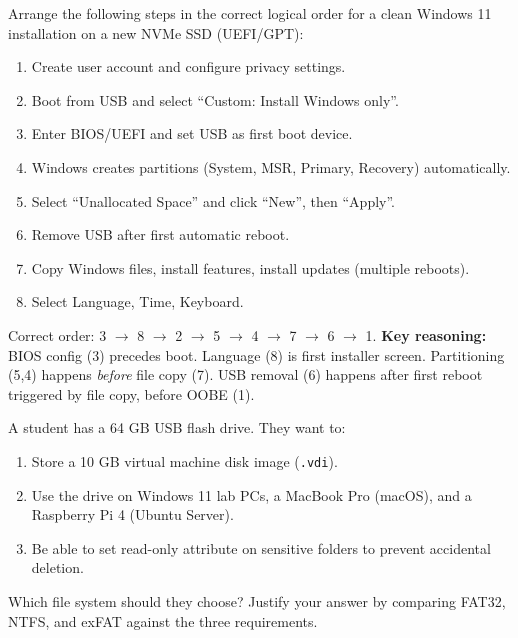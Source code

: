 \documentclass[11pt]{article}
\begin{document}
\begin{exercice}
Arrange the following steps in the correct logical order for a clean Windows 11 installation on a new NVMe SSD (UEFI/GPT):
\begin{enumerate}
    \item Create user account and configure privacy settings.
    \item Boot from USB and select ``Custom: Install Windows only''.
    \item Enter BIOS/UEFI and set USB as first boot device.
    \item Windows creates partitions (System, MSR, Primary, Recovery) automatically.
    \item Select ``Unallocated Space'' and click ``New'', then ``Apply''.
    \item Remove USB after first automatic reboot.
    \item Copy Windows files, install features, install updates (multiple reboots).
    \item Select Language, Time, Keyboard.
\end{enumerate}
\end{exercice}


\begin{corrige}[Exercise 1]
Correct order: 3 $\rightarrow$ 8 $\rightarrow$ 2 $\rightarrow$ 5 $\rightarrow$ 4 $\rightarrow$ 7 $\rightarrow$ 6 $\rightarrow$ 1.
\textbf{Key reasoning:} BIOS config (3) precedes boot. Language (8) is first installer screen. Partitioning (5,4) happens \emph{before} file copy (7). USB removal (6) happens after first reboot triggered by file copy, before OOBE (1).
\end{corrige}


\begin{exercice}
A student has a 64 GB USB flash drive. They want to:
\begin{enumerate}
    \item Store a 10 GB virtual machine disk image (\texttt{.vdi}).
    \item Use the drive on Windows 11 lab PCs, a MacBook Pro (macOS), and a Raspberry Pi 4 (Ubuntu Server).
    \item Be able to set read-only attribute on sensitive folders to prevent accidental deletion.
\end{enumerate}
Which file system should they choose? Justify your answer by comparing FAT32, NTFS, and exFAT against the three requirements.
\end{exercice}
\end{document}
